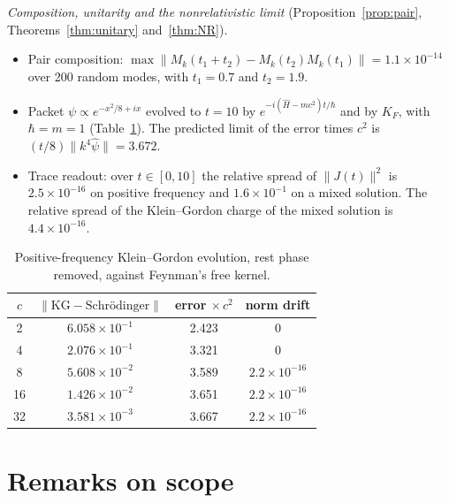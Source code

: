 \documentclass[11pt]{amsart}
\theoremstyle{definition}
\theoremstyle{remark}
\begin{document}
\emph{Composition, unitarity and the nonrelativistic limit} (Proposition~\ref{prop:pair}, Theorems~\ref{thm:unitary} and~\ref{thm:NR}).
\begin{itemize}
\item Pair composition: $\max\lVert M_k(t_1+t_2)-M_k(t_2)M_k(t_1)\rVert=1.1\times10^{-14}$ over 200 random modes, with $t_1=0.7$ and $t_2=1.9$.
\item Packet $\psi\propto e^{-x^2/8+ix}$ evolved to $t=10$ by $e^{-i(\hat H-mc^2)t/\hbar}$ and by $K_F$, with $\hbar=m=1$ (Table~\ref{tab:NR}). The predicted limit of the error times $c^2$ is $(t/8)\lVert k^4\hat\psi\rVert=3.672$.
\item Trace readout: over $t\in[0,10]$ the relative spread of $\lVert J(t)\rVert^2$ is $2.5\times10^{-16}$ on positive frequency and $1.6\times10^{-1}$ on a mixed solution. The relative spread of the Klein--Gordon charge of the mixed solution is $4.4\times10^{-16}$.
\end{itemize}

\begin{table}[h]
\centering
\begin{tabular}{cccc}
\toprule
$c$ & $\lVert\text{KG}-\text{Schr\"odinger}\rVert$ & error $\times\,c^2$ & norm drift\\
\midrule
2 & $6.058\times10^{-1}$ & 2.423 & 0\\
4 & $2.076\times10^{-1}$ & 3.321 & 0\\
8 & $5.608\times10^{-2}$ & 3.589 & $2.2\times10^{-16}$\\
16 & $1.426\times10^{-2}$ & 3.651 & $2.2\times10^{-16}$\\
32 & $3.581\times10^{-3}$ & 3.667 & $2.2\times10^{-16}$\\
\bottomrule
\end{tabular}
\caption{Positive-frequency Klein--Gordon evolution, rest phase removed, against Feynman's free kernel.}\label{tab:NR}
\end{table}

\section{Remarks on scope}
\end{document}
